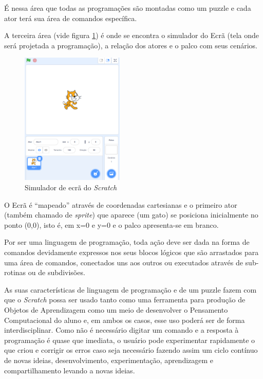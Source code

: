 \documentclass[12pt, openright, a4paper, brazil, english, french, spanish, bibjustif, openany, oneside]{abntex2}
\begin{document}
É nessa área que todas as programações são montadas como um puzzle e cada ator terá sua área de comandos específica.


A terceira área (vide figura \ref{scr4}) é onde se encontra o simulador do Ecrã (tela onde será projetada a programação), a relação dos atores e o palco com seus cenários.

\begin{figure}[H]

    \center
    \caption{Simulador de ecrã do \textit{Scratch} \label{scr4}}
    \includegraphics[height=6.3cm]{scratch4.png}
    
\end{figure}

O Ecrã é ``mapeado'' através de coordenadas cartesianas e o primeiro ator (também chamado de \textit{sprite}) que aparece (um gato) se posiciona inicialmente no ponto (0,0), isto é, em x=0 e y=0 e o palco apresenta-se em branco.


Por ser uma linguagem de programação, toda ação deve ser dada na forma de comandos devidamente expressos nos seus blocos lógicos que são arrastados para uma área de comandos, conectados uns aos outros ou executados através de sub-rotinas ou de subdivisões. 


 
 As suas características de linguagem de programação e de um puzzle fazem com que o \textit{Scratch} possa ser usado tanto como uma ferramenta para produção de Objetos de Aprendizagem como um meio de desenvolver o Pensamento Computacional do aluno e, em ambos os casos, esse uso poderá ser de forma interdisciplinar. Como não é necessário digitar um comando e a resposta à programação é quase que imediata, o usuário pode experimentar rapidamente o que criou e corrigir os erros caso seja necessário fazendo assim um ciclo contínuo de novas ideias, desenvolvimento, experimentação, aprendizagem e compartilhamento levando a novas ideias. 
\end{document}
